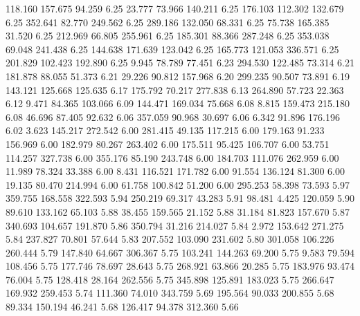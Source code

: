  118.160  157.675   94.259         6.25
  23.777   73.966  140.211         6.25
 176.103  112.302  132.679         6.25
 352.641   82.770  249.562         6.25
 289.186  132.050   68.331         6.25
  75.738  165.385   31.520         6.25
 212.969   66.805  255.961         6.25
 185.301   88.366  287.248         6.25
 353.038   69.048  241.438         6.25
 144.638  171.639  123.042         6.25
 165.773  121.053  336.571         6.25
 201.829  102.423  192.890         6.25
   9.945   78.789   77.451         6.23
 294.530  122.485   73.314         6.21
 181.878   88.055   51.373         6.21
  29.226   90.812  157.968         6.20
 299.235   90.507   73.891         6.19
 143.121  125.668  125.635         6.17
 175.792   70.217  277.838         6.13
 264.890   57.723   22.363         6.12
   9.471   84.365  103.066         6.09
 144.471  169.034   75.668         6.08
   8.815  159.473  215.180         6.08
  46.696   87.405   92.632         6.06
 357.059   90.968   30.697         6.06
   6.342   91.896  176.196         6.02
   3.623  145.217  272.542         6.00
 281.415   49.135  117.215         6.00
 179.163   91.233  156.969         6.00
 182.979   80.267  263.402         6.00
 175.511   95.425  106.707         6.00
  53.751  114.257  327.738         6.00
 355.176   85.190  243.748         6.00
 184.703  111.076  262.959         6.00
  11.989   78.324   33.388         6.00
   8.431  116.521  171.782         6.00
  91.554  136.124   81.300         6.00
  19.135   80.470  214.994         6.00
  61.758  100.842   51.200         6.00
 295.253   58.398   73.593         5.97
 359.755  168.558  322.593         5.94
 250.219   69.317   43.283         5.91
  98.481    4.425  120.059         5.90
  89.610  133.162   65.103         5.88
  38.455  159.565   21.152         5.88
  31.184   81.823  157.670         5.87
 340.693  104.657  191.870         5.86
 350.794   31.216  214.027         5.84
   2.972  153.642  271.275         5.84
 237.827   70.801   57.644         5.83
 207.552  103.090  231.602         5.80
 301.058  106.226  260.444         5.79
 147.840   64.667  306.367         5.75
 103.241  144.263   69.200         5.75
   9.583   79.594  108.456         5.75
 177.746   78.697   28.643         5.75
 268.921   63.866   20.285         5.75
 183.976   93.474   76.004         5.75
 128.418   28.164  262.556         5.75
 345.898  125.891  183.023         5.75
 266.647  169.932  259.453         5.74
 111.360   74.010  343.759         5.69
 195.564   90.033  200.855         5.68
  89.334  150.194   46.241         5.68
 126.417   94.378  312.360         5.66
